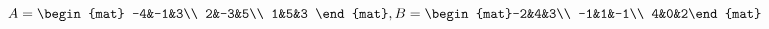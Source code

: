 \begin{Exercise}[
name={},
title={}, 
difficulty=0,
origin={\cite{GH}}]
\begin{multicols}{2}
\Question $A=\begin{mat} -4&-1&3\\  2&-3&5\\  1&5&3 \end{mat}, \\ B=\begin{mat}-2&4&3\\  -1&1&-1\\  4&0&2\end{mat}$
\EndCurrentQuestion
\end{multicols}

\end{Exercise}

